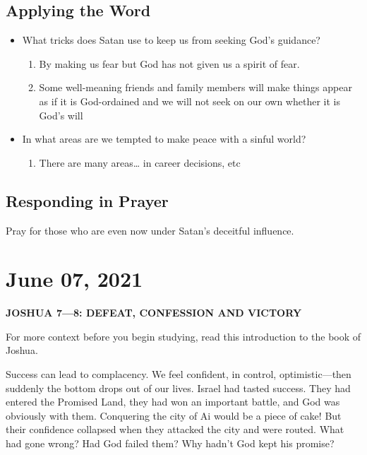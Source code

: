 \documentclass[11pt]{article}
\begin{document}
\subsection{Applying the Word}
\label{sec:orged5f774}

\begin{itemize}
\item What tricks does Satan use to keep us from seeking God's guidance?
\begin{enumerate}
\item By making us fear but God has not given us a spirit of fear.
\item Some well-meaning friends and family members will make things
appear as if it is God-ordained and we will not seek on our own
whether it is God's will
\end{enumerate}

\item In what areas are we tempted to make peace with a sinful world?
\begin{enumerate}
\item There are many areas\ldots{} in career decisions, etc
\end{enumerate}
\end{itemize}

\subsection{Responding in Prayer}
\label{sec:org8b6bd01}

Pray for those who are even now under Satan's deceitful influence.

\section{June 07, 2021}
\label{sec:orga8995f9}

\textbf{\textbf{JOSHUA 7—8: DEFEAT, CONFESSION AND VICTORY}}

For more context before you begin studying, read this introduction to
the book of Joshua.

Success can lead to complacency. We feel confident, in control,
optimistic—then suddenly the bottom drops out of our lives. Israel had
tasted success. They had entered the Promised Land, they had won an
important battle, and God was obviously with them. Conquering the city
of Ai would be a piece of cake! But their confidence collapsed when
they attacked the city and were routed. What had gone wrong? Had God
failed them? Why hadn't God kept his promise?
\end{document}

